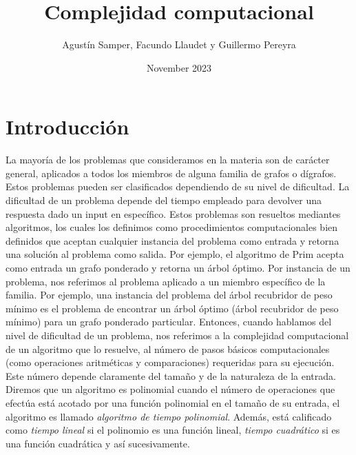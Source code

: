 \documentclass{article}
\title{Complejidad computacional}
\author{Agustín Samper, Facundo Llaudet y Guillermo Pereyra}
\date{November 2023}
\begin{document}
\maketitle
\section*{Introducción}
\indent La mayoría de los problemas que consideramos en la materia son de 
carácter general, aplicados a todos los miembros de alguna familia de
grafos o dígrafos. Estos problemas pueden ser clasificados dependiendo de su nivel de dificultad. \newline
\indent La dificultad de un problema depende del tiempo empleado para
devolver una respuesta dado un input en específico. \newline
\indent Estos problemas son resueltos mediantes algoritmos, los cuales
los definimos como procedimientos computacionales bien definidos que 
aceptan cualquier instancia del problema como entrada y retorna una
solución al problema como salida. Por ejemplo,
el algoritmo de Prim acepta como entrada un grafo ponderado y retorna un
árbol óptimo. \newline
\indent Por instancia de un problema, nos referimos al
problema aplicado a un miembro específico de la familia. Por ejemplo,
una instancia del problema del árbol recubridor de peso mínimo es el
problema de encontrar un árbol óptimo (árbol recubridor de peso mínimo)
para un grafo ponderado particular. \newline
\indent Entonces, cuando hablamos del nivel de dificultad de un problema, nos
referimos a la complejidad computacional de un algoritmo que lo resuelve,
al número de pasos básicos computacionales (como operaciones aritméticas y comparaciones)
requeridas para su ejecución. Este número depende claramente del tamaño y de la 
naturaleza de la entrada. \newline
\indent Diremos que un algoritmo es polinomial cuando el número de
operaciones que efectúa está acotado por una función polinomial en
el tamaño de su entrada, el algoritmo es llamado \textit{algoritmo
de tiempo polinomial}. Además, está calificado como \textit{tiempo lineal}
si el polinomio es una función lineal, \textit{tiempo cuadrático} si 
es una función cuadrática y así sucesivamente.
\end{document}
